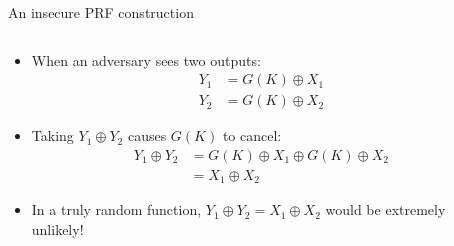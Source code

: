 \documentclass[aspectratio=169, lualatex, handout]{beamer}
\begin{document}
\begin{frame}{An insecure PRF construction}
	\begin{columns}[c]
		\begin{column}{0.6\textwidth}
			\begin{itemize}[<+->]
				\item When an adversary sees two outputs:
				      \begin{align*}
					      Y_1 & = G(K) \oplus X_1 \\
					      Y_2 & = G(K) \oplus X_2
				      \end{align*}
				\item Taking $Y_1 \oplus Y_2$ causes $G(K)$ to cancel:
				      \begin{align*}
					      Y_1 \oplus Y_2 & = G(K) \oplus X_1 \oplus G(K) \oplus X_2 \\
					                     & = X_1 \oplus X_2
				      \end{align*}
				\item In a truly random function, $Y_1 \oplus Y_2 = X_1 \oplus X_2$ would be extremely unlikely!
			\end{itemize}
		\end{column}
		\begin{column}{0.4\textwidth}
			\begin{center}
			\end{center}
		\end{column}
	\end{columns}
\end{frame}
\end{document}
